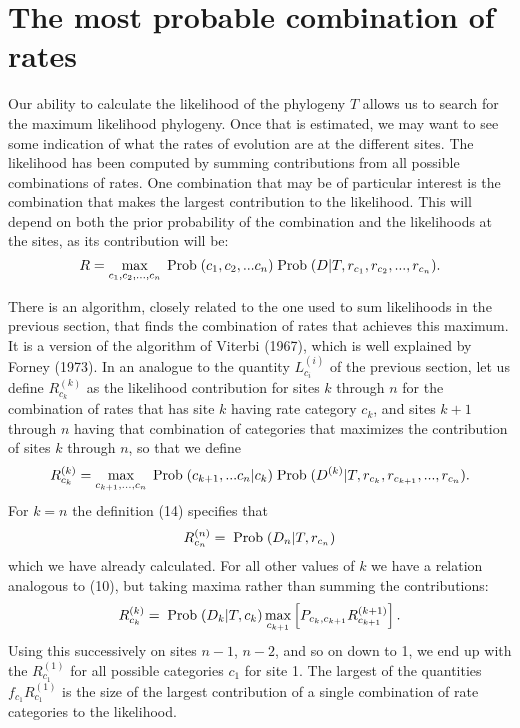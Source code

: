 \documentclass[12pt]{article}
\begin{document}
\section*{The most probable combination of rates}

Our ability to calculate the likelihood of the phylogeny $T$ allows us to
search for the maximum likelihood phylogeny.  Once that is estimated, we
may want to see some indication of what the rates of evolution are at
the different sites.  The likelihood has been computed by summing contributions
from all possible combinations of rates.  One combination that may be of
particular interest is the combination that makes the largest contribution
to the likelihood.  This will depend on both the prior probability of the
combination and the likelihoods at the sites, as its contribution will be:
\begin{equation} %
R =  \max_{c_1, c_2, ..., c_n} \prob(c_1, c_2, ... c_n) \prob(D|T, r_{c_1}, r_{c_2}, ..., r_{c_n}).
\end{equation}

There is an algorithm, closely related to the one used to sum likelihoods in
the previous section, that finds the combination of rates that achieves this
maximum.  It is a version of the algorithm of Viterbi (1967), which is well
explained by Forney (1973).  In an analogue to
the quantity $L_{c_i}^{(i)}$ of the previous section, let us define $R_{c_k}^{(k)}$
as the likelihood contribution for sites $k$ through $n$ for the combination
of rates that has site $k$ having rate category $c_k$, and sites $k+1$ through
$n$ having that combination of categories that maximizes the contribution of
sites $k$ through $n$, so that we define
\begin{equation} %
R_{c_k}^{(k)} =  \max_{c_{k+1}, ..., c_n} \prob(c_{k+1}, ... c_n | c_k) \prob(D^{(k)}|T, r_{c_k}, r_{c_{k+1}}, ..., r_{c_n}).
\end{equation}
For $k=n$ the definition (14) specifies that
\begin{equation}%
R_{c_n}^{(n)} = \prob(D_n|T, r_{c_n})
\end{equation}
which we have already calculated.  For all other values of $k$ we have a
relation analogous to (10), but taking maxima rather than summing the contributions:
\begin{equation}%
R_{c_k}^{(k)} = \prob(D_k|T, c_k)\max_{c_{k+1}} \left[ P_{c_k,c_{k+1}}R_{c_{k+1}}^{(k+1)}\right].
\end{equation}
Using this successively on sites $n-1$, $n-2$, and so on down to 1, we end up
with the $R_{c_1}^{(1)}$ for all possible categories $c_1$ for site 1.  The largest
of the quantities $f_{c_1} R_{c_1}^{(1)}$ is the size of the largest contribution of a single combination of rate categories to the likelihood.
\end{document}

